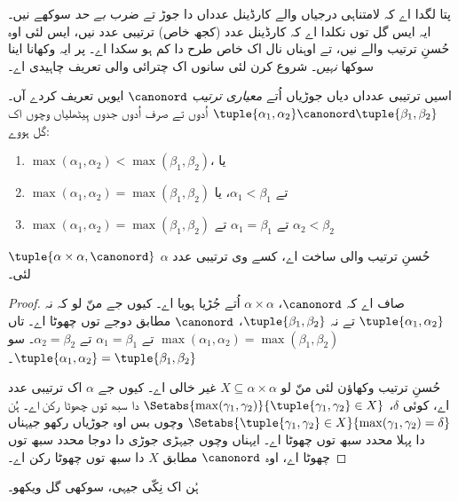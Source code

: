 \documentclass[../../../include/open-logic-section]{subfiles}
\begin{document}


پتا لگدا اے کہ لامتناہی درجیاں والے کارڈینل عدداں دا جوڑ تے ضرب \emph{بے حد} سوکھے نیں۔ ایہ ایس گل توں نکلدا اے کہ کارڈینل عدد (کجھ خاص) ترتیبی عدد نیں، ایس لئی اوہ حُسنِ ترتیب والے نیں، تے اوہناں نال اک خاص طرح دا کم ہو سکدا اے۔ پر ایہ وکھانا اینا سوکھا \emph{نہیں}۔ شروع کرن لئی سانوں اک چترائی والی تعریف چاہیدی اے۔

\begin{defn}
اسیں ترتیبی عدداں دیاں جوڑیاں اُتے \emph{معیاری ترتیب} $\canonord$ ایویں تعریف کردے آں۔ $\tuple{\alpha_1, \alpha_2} \canonord
\tuple{\beta_1, \beta_2}$ اُدوں تے صرف اُدوں جدوں ہِیٹھلیاں وچوں اک گل ہووے:
\begin{enumerate}
	\item $\max(\alpha_1, \alpha_2) < \max(\beta_1, \beta_2)$، یا
	\item $\max(\alpha_1, \alpha_2) = \max(\beta_1, \beta_2)$ تے
	$\alpha_1 < \beta_1$، یا
	\item $\max(\alpha_1, \alpha_2) = \max(\beta_1, \beta_2)$ تے
	$\alpha_1 = \beta_1$ تے $\alpha_2 < \beta_2$
\end{enumerate}
\end{defn}

\begin{lem}
$\tuple{\alpha \times \alpha, \canonord}$ حُسنِ ترتیب والی ساخت اے، کسے وی ترتیبی عدد $\alpha$ لئی۔
\end{lem}

\begin{proof}
صاف اے کہ $\canonord$، $\alpha \times \alpha$ اُتے جُڑیا ہویا اے۔ کیوں جے منّ لو کہ نہ $\tuple{\alpha_1, \alpha_2}$ تے نہ $\tuple{\beta_1,
\beta_2}$، $\canonord$ مطابق دوجے توں چھوٹا اے۔ تاں $\max(\alpha_1,
\alpha_2) = \max(\beta_1, \beta_2)$ تے $\alpha_1 = \beta_1$ تے
$\alpha_2 = \beta_2$۔ سو $\tuple{\alpha_1, \alpha_2} =
\tuple{\beta_1,  \beta_2}$۔

حُسنِ ترتیب وکھاؤن لئی منّ لو $X \subseteq \alpha\times\alpha$ غیر خالی اے۔ کیوں جے $\alpha$ اک ترتیبی عدد اے، کوئی $\delta$، $\Setabs{\max(\gamma_1, \gamma_2)}{\tuple{\gamma_1,
\gamma_2} \in X}$ دا سبھ توں چھوٹا رکن اے۔ ہُن
$\Setabs{\tuple{\gamma_1,\gamma_2} \in X}{\max(\gamma_1, \gamma_2) =
\delta}$ وچوں بس اوہ جوڑیاں رکھو جیہناں دا پہلا محدد سبھ توں چھوٹا اے۔ ایہناں وچوں جیہڑی جوڑی دا دوجا محدد سبھ توں چھوٹا اے، اوہ $\canonord$ مطابق $X$ دا سبھ توں چھوٹا رکن اے۔
\end{proof}
\noindent
ہُن اک نِکّی جیہی، سوکھی گل ویکھو۔
\end{document}
